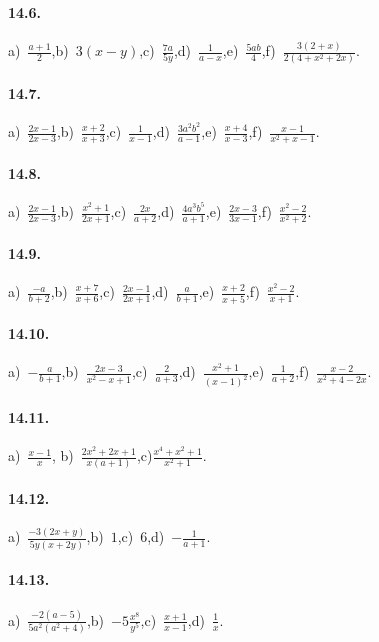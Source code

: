 \paragraph{14.6.}
a)~$\frac{a+1}{2}$,\quad b)~$3(x-y)$,\quad c)~$\frac{7a}{5y}$,\quad d)~$\frac{1}{a-x}$,\quad e)~$\frac{5ab}{4}$,\quad f)~$\frac{3(2+x)}{2\left(4+x^{2}+2x\right)}$.

\paragraph{14.7.}
a)~$\frac{2x-1}{2x-3}$,\quad b)~$\frac{x+2}{x+3}$,\quad c)~$\frac{1}{x-1}$,\quad d)~$\frac{3a^{2}b^{2}}{a-1}$,\quad e)~$\frac{x+4}{x-3}$,\quad f)~$\frac{x-1}{x^2+x-1}$.

\paragraph{14.8.}
a)~$\frac{2x-1}{2x-3}$,\quad b)~$\frac{x^2+1}{2x+1}$,\quad c)~$\frac{2x}{a+2}$,\quad d)~$\frac{4a^{3}b^{5}}{a+1}$,\quad e)~$\frac{2x-3}{3x-1}$,\quad f)~$\frac{x^2-2}{x^2+2}$.

\paragraph{14.9.}
a)~$\frac{-a}{b+2}$,\quad b)~$\frac{x+7}{x+6}$,\quad c)~$\frac{2x-1}{2x+1}$,\quad d)~$\frac{a}{b+1}$,\quad e)~$\frac{x+2}{x+5}$,\quad f)~$\frac{x^{2}-2}{x+1}$.

\paragraph{14.10.}
a)~$-\frac{a}{b+1}$,\quad b)~$\frac{2x-3}{x^2-x+1}$,\quad c)~$\frac{2}{a+3}$,\quad d)~$\frac{x^{2}+1}{(x-1)^2}$,\quad e)~$\frac{1}{a+2}$,\quad f)~$\frac{x-2}{x^2+4-2x}$.

\paragraph{14.11.}
a)~$\frac{x-1}{x}$, %
\quad b)~$\frac{2x^2+2x+1}{x(a+1)}$,\quad c)$\frac{x^{4}+x^{2}+1}{x^2+1}$.

\paragraph{14.12.}
a)~$\frac{-{3(2x+y)}}{5y(x+2y)}$,\quad b)~$1$,\quad c)~$6$,\quad d)~$-{\frac{1}{a+1}}$.

\paragraph{14.13.}
a)~$\frac{-{2(a-5)}}{5a^{2}(a^{2}+4)}$,\quad b)~$-5\frac{x^{8}}{y^{5}}$,\quad c)~$\frac{x+1}{x-1}$,\quad d)~$\frac{1}{x}$.

